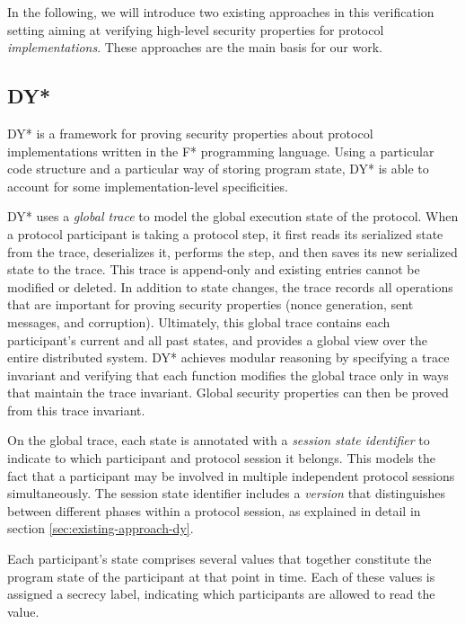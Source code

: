 \documentclass{article}
\begin{document}
In the following, we will introduce two existing approaches in this verification setting  aiming at verifying high-level security properties for protocol \emph{implementations}. These approaches are the main basis for our work.

\subsection{DY*}

DY*\cite{bhargavan2021text} is a framework for proving security properties about protocol implementations written in the F* programming language.
Using a particular code structure and a particular way of storing program state, DY* is able to account for some implementation-level specificities.

DY* uses a \emph{global trace} to model the global execution state of the protocol.
When a protocol participant is taking a protocol step, it first reads its serialized state from the trace, deserializes it, performs the step, and then saves its new serialized state to the trace. This trace is append-only and existing entries cannot be modified or deleted. In addition to state changes, the trace records all operations that are important for proving security properties (nonce generation, sent messages, and corruption).
Ultimately, this global trace contains each participant's current and all past states, and provides a global view over the entire distributed system. %
DY* achieves modular reasoning by specifying a trace invariant and verifying that each function modifies the global trace only in ways that maintain the trace invariant. Global security properties can then be proved from this trace invariant.

On the global trace, each state is annotated with a \emph{session state identifier} to indicate to which participant and protocol session it belongs. This models the fact that a participant may be involved in multiple independent protocol sessions simultaneously. The session state identifier includes a \emph{version} that distinguishes between different phases within a protocol session, as explained in detail in section \ref*{sec:existing-approach-dy}.

Each participant's state comprises several values that together constitute the program state of the participant at that point in time. Each of these values is assigned a secrecy label, indicating which participants are allowed to read the value.
\end{document}
